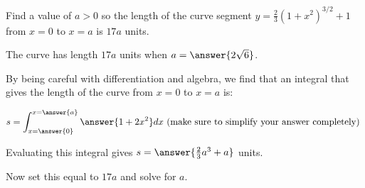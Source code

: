 \documentclass{ximera}
\author{Jim Talamo}
\begin{document}
\begin{exercise}

Find a value of $a>0$ so the length of the curve segment $y=\frac{2}{3}\left(1+x^2\right)^{3/2} +1$ from $x=0$ to $x=a$ is $17a$ units.



The curve has length $17a$ units when $a=\answer{2\sqrt{6}}$.

\begin{hint}
By being careful with differentiation and algebra, we find that an integral that gives the length of the curve from $x=0$ to $x=a$ is:

\[
s= \int_{x=\answer{0}}^{x=\answer{a}} \answer{ 1+2x^2} dx \textrm{ (make sure to simplify your answer completely) }
\]

Evaluating this integral gives $s = \answer{\frac{2}{3}a^3+a}$ units.

Now set this equal to $17a$ and solve for $a$.
\end{hint}

\end{exercise}
\end{document}
